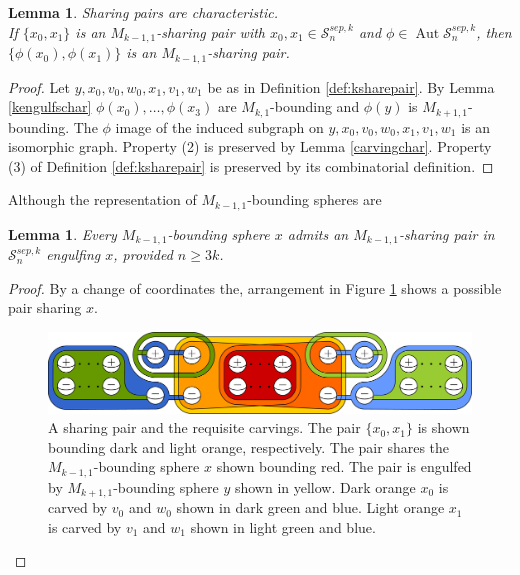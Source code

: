 \documentclass[11pt]{article}
\DeclareMathOperator{\aaut}{Aut}
\newtheorem{lemma}[theorem]{Lemma}
\theoremstyle{remark}
\theoremstyle{definition}
\begin{document}
\begin{lemma}
  Sharing pairs are characteristic.\\
  If $\{x_0,x_1\}$ is an $M_{k-1,1}$-sharing pair with $x_0,x_1 \in \mathcal S^{sep,k}_n$
  and $\phi \in \aaut \mathcal S^{sep,k}_n$,
  then $\{\phi(x_0),\phi(x_1)\}$ is an $M_{k-1,1}$-sharing pair.
  \label{lemma:sharepreserve}
\end{lemma}

\begin{proof}
  Let $y,x_0,v_0,w_0,x_1,v_1,w_1$ be as in Definition \ref{def:ksharepair}.
  By Lemma \ref{kengulfschar} $\phi(x_0),\ldots, \phi(x_3)$
  are $M_{k,1}$-bounding and $\phi(y)$ is $M_{k+1,1}$-bounding.
  The $\phi$ image of the induced subgraph on $y,x_0,v_0,w_0,x_1,v_1,w_1$
  is an isomorphic graph.
  Property (2) is preserved by Lemma \ref{carvingchar}.
  Property (3) of Definition \ref{def:ksharepair}
  is preserved by its combinatorial definition.
\end{proof}

Although the representation of $M_{k-1,1}$-bounding spheres
are

\begin{lemma}
  Every $M_{k-1,1}$-bounding sphere $x$ admits an $M_{k-1,1}$-sharing pair in
  $\mathcal S^{sep,k}_{n}$ engulfing $x$, provided $n\geq 3k$.
  \label{lemma:ksharexist}
\end{lemma}

\begin{proof}
  By a change of coordinates the,
  arrangement in Figure \ref{fig:ksharing} shows a possible pair sharing $x$.

  \begin{figure}[h!]
  \includegraphics[width=\textwidth]{figures/ksharingnotpent.pdf}
  \caption{
    A sharing pair and the requisite carvings.
    The pair $\{x_0,x_1\}$ is shown bounding dark and light orange, respectively.
    The pair shares the $M_{k-1,1}$-bounding sphere $x$ shown bounding red.
    The pair is engulfed by $M_{k+1,1}$-bounding sphere $y$ shown in yellow.
    Dark orange $x_0$ is carved by $v_0$ and $w_0$ shown in dark green and blue.
    Light orange $x_1$ is carved by $v_1$ and $w_1$ shown in light green and blue.
  }
  \label{fig:ksharing}
  \end{figure}
\end{proof}
\end{document}
